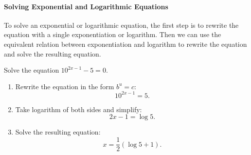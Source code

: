 
\paragraph*{Solving Exponential and Logarithmic Equations}
To solve an exponential or logarithmic equation, the first step is to rewrite the equation with a single exponentiation or logarithm. Then we can use the equivalent relation between exponentiation and logarithm to rewrite the equation and solve the resulting equation.


	\begin{example}
		Solve the equation \quad $10^{2x-1}-5=0$.
	\end{example}
	\begin{solution}\mbox{}
		\begin{enumerate}[label={\textbf{\textup{Step \arabic*.}}~}]
			\item  Rewrite the equation in the form $b^u=c$: 
			$$10^{2x-1}=5.$$
			\item Take logarithm of both sides and simplify: $$2x-1=\log 5.$$
			\item Solve the resulting equation: 
			$$x=\frac{1}{2}(\log5+1).$$
		\end{enumerate}
	\end{solution}

